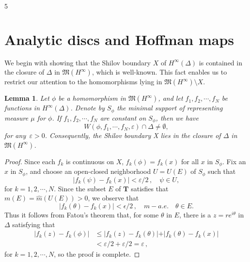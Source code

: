 \documentclass[12pt]{amsart}
\theoremstyle{plain}
\newtheorem{lem}{Lemma}[section]
\numberwithin{equation}{section}
\begin{document}
5%









\bigskip
\bigskip
\section{Analytic discs and Hoffman maps}
\label{S2}
We begin with showing that the Shilov boundary $X$ of
$H^\infty(\Delta)$ is contained in the
closure of $\Delta$ in $\mathfrak{M}(H^\infty)$, which is well-known. This
fact enables us to restrict our attention to the homomorphisms lying in
$\mathfrak{M}(H^\infty)\setminus X$.

\begin{lem}
\label{lem2.1}
Let $\phi$ be a homomorphism in $\mathfrak{M}(H^\infty)$,
and let $f_1, f_2, \cdots, f_N $ be functions in $H^\infty(\Delta)$.
Denote by $S_\phi$ the minimal support of representing measure $\mu$
for $\phi$. If $f_1, f_2, \cdots, f_N $ are constant on $S_\phi$,
then we have
$$
W(\phi, f_1, \cdots, f_N, \varepsilon)
\cap \Delta \neq \emptyset,
$$
for any \,$\varepsilon >0 $.
Consequently, the Shilov boundary X lies in the
closure of $\Delta$ in $\mathfrak{M}(H^\infty)$.
\end{lem}

\begin{proof}
Since each $f_k$ is continuous on $X$, $f_k(\phi) = f_k(x)$
for all $x$ in $S_\phi$. Fix an $x$ in $S_\phi$, and
choose an open-closed
neighborhood $U=U(E)$ of $S_\phi$ such that
$$
\vert f_k(\psi) - f_k(x)  \vert < \varepsilon/2\,, \quad \psi \in U,
$$
for $k=1, 2, \cdots, N$.
Since the subset $E$ of $\mathbf{T}$ satisfies that
$m(E) = \widehat{m}(U(E)) > 0$, we observe that
$$
\vert f_k(\theta) - f_k(x) \vert < \epsilon/2\,, \quad m-a.e. \quad
\theta \in E.
$$
Thus it follows from Fatou's theorem that, for some $\theta$ in $E$,
there is a $z=re^{i\theta}$ in $\Delta$ satisfying that
\begin{align*}
\vert f_k(z) - f_k(\phi) \vert
& \le \vert f_k(z) - f_k(\theta) \vert +\vert f_k(\theta) - f_k(x) \vert\\
& < \varepsilon/2 + \varepsilon/2 = \varepsilon\,,
\end{align*}
for $k=1, 2, \cdots, N$, so the proof is complete.
\end{proof}
\end{document}
